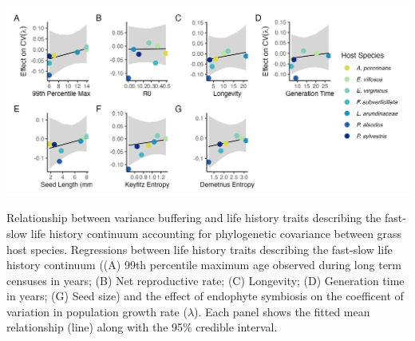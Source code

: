 \documentclass[lineno, sn-basic]{sn-jnl}%
\begin{document}
\begin{myfigure}[H]
	\centering
	\includegraphics[width=\linewidth]{lh_plant_plot.png}
	\caption[Relationship between variance buffering and life history traits describing the fast-slow life history continuum accounting for phylogenetic covariance between \emph{Epichlo\"{e}} symbionts]{Relationship between variance buffering and life history traits describing the fast-slow life history continuum accounting for phylogenetic covariance between grass host species. Regressions between life history traits describing the fast-slow life history continuum ((A) 99th percentile maximum age observed during long term censuses in years; (B) Net reproductive rate; (C) Longevity; (D) Generation time in years; (G) Seed size) and the effect of endophyte symbiosis on the coefficent of variation in population growth rate ($\lambda$). Each panel shows the fitted mean relationship (line) along with the 95\% credible interval.}
\end{myfigure}
\end{document}
